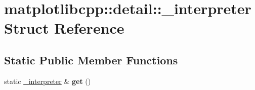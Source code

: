 \hypertarget{structmatplotlibcpp_1_1detail_1_1__interpreter}{}\section{matplotlibcpp\+:\+:detail\+:\+:\+\_\+interpreter Struct Reference}
\label{structmatplotlibcpp_1_1detail_1_1__interpreter}
\subsection*{Static Public Member Functions}
\begin{DoxyCompactItemize}
\item 
static \hyperlink{structmatplotlibcpp_1_1detail_1_1__interpreter}{\+\_\+interpreter} \& {\bfseries get} ()\hypertarget{structmatplotlibcpp_1_1detail_1_1__interpreter_a3ddc4e50c23738307da3dc64c47cdbc0}{}\label{structmatplotlibcpp_1_1detail_1_1__interpreter_a3ddc4e50c23738307da3dc64c47cdbc0}

\end{DoxyCompactItemize}
